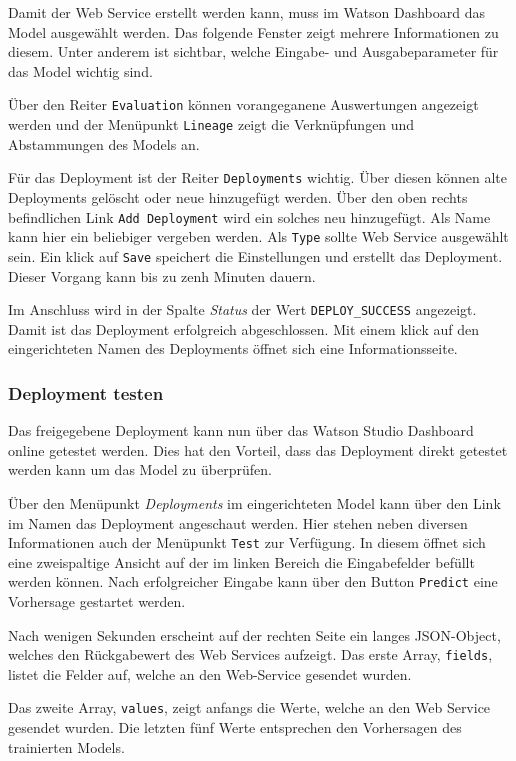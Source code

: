 Damit der Web Service erstellt werden kann, muss im Watson Dashboard das Model ausgewählt werden. Das folgende Fenster
zeigt mehrere Informationen zu diesem. Unter anderem ist sichtbar, welche Eingabe- und Ausgabeparameter für das Model
wichtig sind.

Über den Reiter \texttt{Evaluation} können vorangeganene Auswertungen angezeigt werden und der Menüpunkt \texttt{Lineage}
zeigt die Verknüpfungen und Abstammungen des Models an.

Für das Deployment ist der Reiter \texttt{Deployments} wichtig. Über diesen können alte Deployments gelöscht oder neue
hinzugefügt werden. Über den oben rechts befindlichen Link \texttt{Add Deployment} wird ein solches neu hinzugefügt. Als
Name kann hier ein beliebiger vergeben werden. Als \texttt{Type} sollte Web Service ausgewählt sein. Ein klick auf
\texttt{Save} speichert die Einstellungen und erstellt das Deployment. Dieser Vorgang kann bis zu zenh Minuten dauern.

Im Anschluss wird in der Spalte \textit{Status} der Wert \texttt{DEPLOY\_SUCCESS} angezeigt. Damit ist das Deployment
erfolgreich abgeschlossen. Mit einem klick auf den eingerichteten Namen des Deployments öffnet sich eine
Informationsseite.

\subsubsection{Deployment testen}
Das freigegebene Deployment kann nun über das Watson Studio Dashboard online getestet werden. Dies hat den Vorteil, dass
das Deployment direkt getestet werden kann um das Model zu überprüfen.

Über den Menüpunkt \textit{Deployments} im eingerichteten Model kann über den Link im Namen das Deployment angeschaut
werden. Hier stehen neben diversen Informationen auch der Menüpunkt \texttt{Test} zur Verfügung. In diesem öffnet sich
eine zweispaltige Ansicht auf der im linken Bereich die Eingabefelder befüllt werden können. Nach erfolgreicher Eingabe
kann über den Button \texttt{Predict} eine Vorhersage gestartet werden.

Nach wenigen Sekunden erscheint auf der rechten Seite ein langes JSON-Object, welches den Rückgabewert des Web Services
aufzeigt. Das erste Array, \texttt{fields}, listet die Felder auf, welche an den Web-Service gesendet wurden.

Das zweite Array, \texttt{values}, zeigt anfangs die Werte, welche an den Web Service gesendet wurden. Die letzten fünf
Werte entsprechen den Vorhersagen des trainierten Models.


